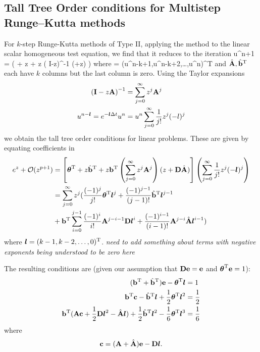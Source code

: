 \documentclass[12pt]{article}
\begin{document}
\subsection{Tall Tree Order conditions for Multistep Runge--Kutta methods}
For $k$-step Runge-Kutta methods of Type II,
applying the method to the linear scalar homogeneous test equation, we
find that it reduces to the iteration
\be
u^{n+1} = \left( \btheta\transpose + z \hat{\vb}\transpose + z \vb\transpose ( I-z\mA)^{-1} (\mD+z\hat{\mA}) \right) \vu
\ee
where
\be
\vu = \left(u^{n-k+1},u^{n-k+2},\dots,u^{n}\right)^T
\ee
and $\hat{\mathbf{A}},\hat{\mathbf{b}}^\mathrm{T}$ each have $k$ columns but the last column is zero.
Using the Taylor expansions 
\begin{subequations}
\begin{align}
\left( \mathbf{I} - z\mathbf{A} \right)^{-1}  & = \sum_{j=0}^\infty z^j \mathbf{A}^j \\
u^{n-\boldsymbol{l}} = e^{-\boldsymbol{l}\Delta t}u^n  & = u^n \sum_{j=0}^\infty \frac{1}{j!} z^j (-l)^j
\end{align}
\end{subequations}
we obtain the tall tree order conditions for linear problems.
These are given by equating coefficients in
\begin{align}
e^z + \Oop(z^{p+1}) & = 
    \left[ \btheta\transpose + z \bhT + z \bT
    \left(\sum_{j=0}^\infty z^j \mA^j \right) (z + \mD \hat{\mA})\right]
    \left(\sum_{j=0}^\infty \frac{1}{j!}z^j (-\vl)^j\right) \nonumber \\
 & = \sum_{j=0}^\infty z^j {\huge(} \frac{(-1)^j}{j!} \btheta\transpose \vl^j
    + \frac{(-1)^{j-1}}{(j-1)!}\bhT \vl^{j-1} \\
    & + \bT \sum_{i=0}^{j-1}\frac{(-1)^i}{i!}\mA^{j-i-1}\mD\vl^i
    + \frac{(-1)^{i-1}}{(i-1)!}\mA^{j-i}\hat{\mA}\vl^{i-1} \nonumber
    {\huge)}
\end{align}
where $\boldsymbol{l}=(k-1,k-2,\dots,0)^\mathrm{T}$.
{\em need to add something about terms with negative exponents
being understood to be zero here}

The resulting conditions are (given our assumption that $\mathbf{D}\mathbf{e}=\mathbf{e}$ and 
$\boldsymbol{\theta}^\mathrm{T}\mathbf{e}=1$):
\begin{subequations}
\begin{align}
(\mathbf{b}^\mathrm{T} + \hat{\mathbf{b}}^\mathrm{T})\mathbf{e} - \boldsymbol{\theta}^\mathrm{T}\boldsymbol{l} & = 1 \\
\mathbf{b}^\mathrm{T}\mathbf{c} - \hat{\mathbf{b}}^\mathrm{T}\boldsymbol{l}
    + \frac{1}{2}\boldsymbol{\theta}^\mathrm{T}\boldsymbol{l}^2 & = \frac{1}{2} \\
\mathbf{b}^\mathrm{T}(\mathbf{A}\mathbf{c} + \frac{1}{2}\mathbf{D}\boldsymbol{l}^2 - \hat{\mathbf{A}}\boldsymbol{l}) +\frac{1}{2}\hat{\mathbf{b}}^\mathrm{T}\boldsymbol{l}^2 
    - \frac{1}{6}\boldsymbol{\theta}^\mathrm{T}\boldsymbol{l}^3 & = \frac{1}{6}
\end{align}
\end{subequations}
where
$$ \mathbf{c} = (\mathbf{A}+\hat{\mathbf{A}})\mathbf{e} - \mathbf{D}\boldsymbol{l}.$$
\end{document}
